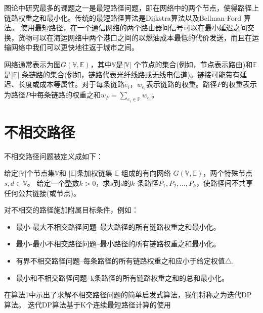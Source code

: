 图论中研究最多的课题之一是最短路径问题，即在网络中的两个节点，使得路径上链路权重之和最小化。传统的最短路径算法是Dijkstra算法\cite{dijkstra1959note}以及Bellman-Ford 算法\cite{toth2002vehicle,ford2015flows}。 使用最短路径，在一个通信网络的两个路由器间信号可以在最小延迟之间交换，货物可以在海运网络中两个港口之间的以燃油成本最低的代价发送，而且在运输网络中我们可以更快地往返于城市之间。

网络通常表示为图$G(\mathbb{V},\mathbb{E})$，其中$\mathbb{V}$是$|\mathbb{V}|$ 个节点的集合(例如，节点表示路由)和$\mathbb{E}$是$|\mathbb{E}|$ 条链路的集合(例如，链路代表光纤线路或无线电信道)。链接可能带有延迟、长度或成本等属性。对于每条链路$e_i$，$w_{e_i}$表示链路的权重。路径$P$的权重表示为路径$P$中每条链路的权重之和$w_P=\sum\limits_{e_i\in \mathbb{P}}w_{e_i}$。
\section{不相交路径}
不相交路径问题被定义成如下：

\begin{definition}[不相交路径问题]
给定$|\mathbb{V}|$个节点集$\mathbb{V}$和 $|\mathbb{E}|$条加权链集 $\mathbb{E}$ 组成的有向网络 $G(\mathbb{V},\mathbb{E})$，两个特殊节点$s,d\in\mathbb{V}$。 给定一个整数$k>0$，求$s$到$d$的$k$ 条路径$P_1,P_2,\ldots,P_k$，使路径间不共享任何公共链接(或节点)。
\end{definition}

对不相交的路径施加附属目标条件，例如：
\begin{itemize}
  \item 最小-最大不相交路径问题--最大路径的所有链路权重之和最小化。
  \item 最小-最小不相交路径问题--最小路径的所有链路权重之和最小化。
  \item 有界不相交路径问题--每条路径的所有链路权重之和应小于给定权值$\bigtriangleup$.
  \item 最小和不相交路径问题--k条路径的所有链路权重之和的总和最小化。
\end{itemize}
在算法1中示出了求解不相交路径问题的简单启发式算法，我们将称之为迭代DP 算法。
迭代DP算法基于K个连续最短路径计算的使用

